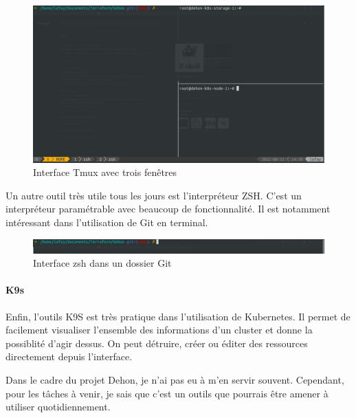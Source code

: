 \documentclass[12pt]{article}
\begin{document}
\begin{figure}[!ht]
    \centering
        \includegraphics[width=\textwidth]{src/tmux.png}
    \caption{Interface Tmux avec trois fenêtres}
    \label{fig:tmux}
\end{figure}

Un autre outil très utile tous les jours est l'interpréteur ZSH.
C'est un interpréteur paramétrable avec beaucoup de fonctionnalité.
Il est notamment intéressant dans l'utilisation de Git en terminal.

\begin{figure}[!ht]
    \centering
        \includegraphics[width=\textwidth]{src/zsh.png}
    \caption{Interface zsh dans un dossier Git}
    \label{fig:zsh}
\end{figure}

\newpage
\paragraph{K9s}

Enfin, l'outils K9S est très pratique dans l'utilisation de \gls{Kubernetes}.
Il permet de facilement visualiser l'ensemble des informations d'un \gls{cluster} et donne la possiblité d'agir dessus.
On peut détruire, créer ou éditer des ressources directement depuis l'interface.

Dans le cadre du projet Dehon, je n'ai pas eu à m'en servir souvent.
Cependant, pour les tâches à venir, je sais que c'est un outils que pourrais être amener à utiliser quotidiennement.
\end{document}

